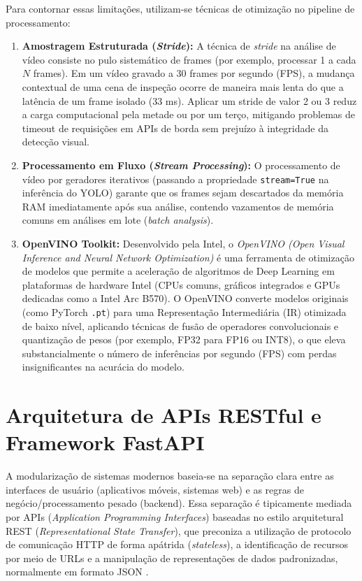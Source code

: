 Para contornar essas limitações, utilizam-se técnicas de otimização no pipeline de processamento:
\begin{enumerate}
    \item \textbf{Amostragem Estruturada (\textit{Stride}):} A técnica de \textit{stride} na análise de vídeo consiste no pulo sistemático de frames (por exemplo, processar 1 a cada $N$ frames). Em um vídeo gravado a 30 frames por segundo (FPS), a mudança contextual de uma cena de inspeção ocorre de maneira mais lenta do que a latência de um frame isolado (33 ms). Aplicar um stride de valor 2 ou 3 reduz a carga computacional pela metade ou por um terço, mitigando problemas de timeout de requisições em APIs de borda sem prejuízo à integridade da detecção visual.
    \item \textbf{Processamento em Fluxo (\textit{Stream Processing}):} O processamento de vídeo por geradores iterativos (passando a propriedade \texttt{stream=True} na inferência do YOLO) garante que os frames sejam descartados da memória RAM imediatamente após sua análise, contendo vazamentos de memória comuns em análises em lote (\textit{batch analysis}).
    \item \textbf{OpenVINO Toolkit:} Desenvolvido pela Intel, o \textit{OpenVINO (Open Visual Inference and Neural Network Optimization)} é uma ferramenta de otimização de modelos que permite a aceleração de algoritmos de Deep Learning em plataformas de hardware Intel (CPUs comuns, gráficos integrados e GPUs dedicadas como a Intel Arc B570). O OpenVINO converte modelos originais (como PyTorch \texttt{.pt}) para uma Representação Intermediária (IR) otimizada de baixo nível, aplicando técnicas de fusão de operadores convolucionais e quantização de pesos (por exemplo, FP32 para FP16 ou INT8), o que eleva substancialmente o número de inferências por segundo (FPS) com perdas insignificantes na acurácia do modelo.
\end{enumerate}

\section{Arquitetura de APIs RESTful e Framework FastAPI}
A modularização de sistemas modernos baseia-se na separação clara entre as interfaces de usuário (aplicativos móveis, sistemas web) e as regras de negócio/processamento pesado (backend). Essa separação é tipicamente mediada por APIs (\textit{Application Programming Interfaces}) baseadas no estilo arquitetural REST (\textit{Representational State Transfer}), que preconiza a utilização de protocolo de comunicação HTTP de forma apátrida (\textit{stateless}), a identificação de recursos por meio de URLs e a manipulação de representações de dados padronizadas, normalmente em formato JSON \cite{fielding2000architectural}.

